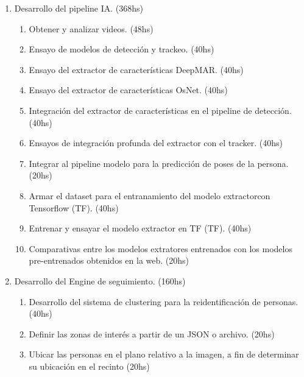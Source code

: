 \documentclass[11pt]{charter}
\begin{document}
\begin{enumerate}
\item Desarrollo del pipeline IA. (368hs)
	\begin{enumerate}
	\item Obtener y analizar videos. (48hs)
	\item Ensayo de modelos de detección y trackeo. (40hs)
	\item Ensayo del extractor de características DeepMAR. (40hs)
	\item Ensayo del extractor de características OsNet. (40hs)
	\item Integración del extractor de características en el pipeline de detección. (40hs)
	\item Ensayos de integración profunda del extractor con el tracker. (40hs)
	\item Integrar al pipeline modelo para la predicción de poses de la persona. (20hs)
	\item Armar el dataset para el entranamiento del modelo extractorcon Tensorflow (TF). (40hs)
	\item Entrenar y ensayar el modelo extractor en TF (TF). (40hs)
	\item Comparativas entre los modelos extratores entrenados con los modelos pre-entrenados obtenidos en la web. (20hs)	
	\end{enumerate}
\item Desarrollo del Engine de seguimiento. (160hs)
	\begin{enumerate}
	\item Desarrollo del sistema de clustering para la reidentificación de personas. (40hs)
	\item Definir las zonas de interés a partir de un JSON o archivo. (20hs)
	\item Ubicar las personas en el plano relativo a la imagen, a fin de determinar su ubicación en el recinto (20hs)
	

\end{enumerate}
\end{enumerate}
\end{document}
